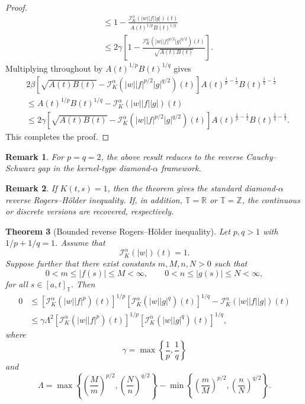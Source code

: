 \documentclass[11pt]{article}
\newtheorem{theorem}{Theorem}[section]
\newtheorem{remark}[theorem]{Remark}
\begin{document}
\begin{proof}
\[\begin{aligned}
&\leq
1-
\frac{
\mathcal{I}_{K}^{\alpha}(|w||f||g|)(t)
}
{
A(t)^{1/p}B(t)^{1/q}
}                                                         \\
&\leq
2\gamma
\left[
1-
\frac{
\mathcal{I}_{K}^{\alpha}
\left(|w||f|^{p/2}|g|^{q/2}\right)(t)
}
{\sqrt{A(t)B(t)}}
\right].
\end{aligned}
\]
Multiplying throughout by $A(t)^{1/p}B(t)^{1/q}$ gives
\[
\begin{aligned}
&2\beta
\left[
\sqrt{A(t)B(t)}
-
\mathcal{I}_{K}^{\alpha}
\left(|w||f|^{p/2}|g|^{q/2}\right)(t)
\right]
A(t)^{\frac1p-\frac12}
B(t)^{\frac1q-\frac12}                                      \\
&\leq
A(t)^{1/p}B(t)^{1/q}
-
\mathcal{I}_{K}^{\alpha}(|w||f||g|)(t)                       \\
&\leq
2\gamma
\left[
\sqrt{A(t)B(t)}
-
\mathcal{I}_{K}^{\alpha}
\left(|w||f|^{p/2}|g|^{q/2}\right)(t)
\right]
A(t)^{\frac1p-\frac12}
B(t)^{\frac1q-\frac12}.
\end{aligned}
\]
This completes the proof.
\end{proof}

\begin{remark}
For $p=q=2$, the above result reduces to the reverse Cauchy--Schwarz gap in the
kernel-type diamond-$\alpha$ framework.
\end{remark}

\begin{remark}
If $K(t,s)=1$, then the theorem gives the standard diamond-$\alpha$ reverse
Rogers--H\"older inequality. If, in addition, $\mathbb{T}=\mathbb{R}$ or
$\mathbb{T}=\mathbb{Z}$, the continuous or discrete versions are recovered,
respectively.
\end{remark}

\begin{theorem}[Bounded reverse Rogers--H\"older inequality]
Let $p,q>1$ with $1/p+1/q=1$. Assume that
\[
    \mathcal{I}_{K}^{\alpha}(|w|)(t)=1.
\]
Suppose further that there exist constants $m,M,n,N>0$ such that
\[
    0<m\leq |f(s)|\leq M<\infty,
    \qquad
    0<n\leq |g(s)|\leq N<\infty,
\]
for all $s\in[a,t]_{\mathbb{T}}$. Then
\[
\begin{aligned}
0
&\leq
\left[
\mathcal{I}_{K}^{\alpha}(|w||f|^p)(t)
\right]^{1/p}
\left[
\mathcal{I}_{K}^{\alpha}(|w||g|^q)(t)
\right]^{1/q}
-
\mathcal{I}_{K}^{\alpha}(|w||f||g|)(t)                         \\
&\leq
\gamma \Lambda^2
\left[
\mathcal{I}_{K}^{\alpha}(|w||f|^p)(t)
\right]^{1/p}
\left[
\mathcal{I}_{K}^{\alpha}(|w||g|^q)(t)
\right]^{1/q},
\end{aligned}
\]
where
\[
    \gamma=\max\left\{\frac1p,\frac1q\right\}
\]
and
\[
    \Lambda=
    \max\left\{
    \left(\frac{M}{m}\right)^{p/2},
    \left(\frac{N}{n}\right)^{q/2}
    \right\}
    -
    \min\left\{
    \left(\frac{m}{M}\right)^{p/2},
    \left(\frac{n}{N}\right)^{q/2}
    \right\}.
\]
\end{theorem}
\end{document}

